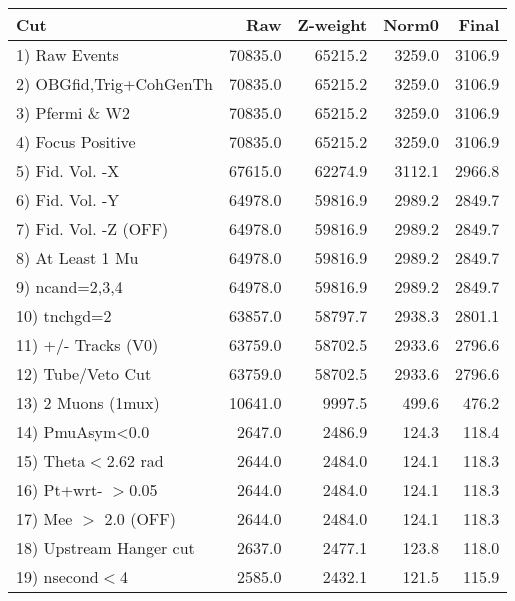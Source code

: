  \begin{table}[h!]\centering
 \begin{tabular}{||l||r|r|r|r||}
 \hline
 \hline
 Cut & Raw & Z-weight & Norm0 & Final \\
 \hline
  1) Raw Events           &     70835.0 &     65215.2 &      3259.0 &      3106.9 \\
  2) OBGfid,Trig+CohGenTh &     70835.0 &     65215.2 &      3259.0 &      3106.9 \\
  3) Pfermi \& W2         &     70835.0 &     65215.2 &      3259.0 &      3106.9 \\
  4) Focus Positive       &     70835.0 &     65215.2 &      3259.0 &      3106.9 \\
  5) Fid. Vol. -X         &     67615.0 &     62274.9 &      3112.1 &      2966.8 \\
  6) Fid. Vol. -Y         &     64978.0 &     59816.9 &      2989.2 &      2849.7 \\
  7) Fid. Vol. -Z (OFF)   &     64978.0 &     59816.9 &      2989.2 &      2849.7 \\
  8) At Least 1 Mu        &     64978.0 &     59816.9 &      2989.2 &      2849.7 \\
  9) ncand=2,3,4          &     64978.0 &     59816.9 &      2989.2 &      2849.7 \\
 10) tnchgd=2             &     63857.0 &     58797.7 &      2938.3 &      2801.1 \\
 11) +/- Tracks (V0)      &     63759.0 &     58702.5 &      2933.6 &      2796.6 \\
 12) Tube/Veto Cut        &     63759.0 &     58702.5 &      2933.6 &      2796.6 \\
 13) 2 Muons (1mux)       &     10641.0 &      9997.5 &       499.6 &       476.2 \\
 14) PmuAsym<0.0          &      2647.0 &      2486.9 &       124.3 &       118.4 \\
 15) Theta$<$2.62 rad     &      2644.0 &      2484.0 &       124.1 &       118.3 \\
 16) Pt+wrt- $>$0.05      &      2644.0 &      2484.0 &       124.1 &       118.3 \\
 17) Mee $>$ 2.0  (OFF)   &      2644.0 &      2484.0 &       124.1 &       118.3 \\
 18) Upstream Hanger cut  &      2637.0 &      2477.1 &       123.8 &       118.0 \\
 19) nsecond$<$4          &      2585.0 &      2432.1 &       121.5 &       115.9 \\

\end{tabular}
\end{table}
